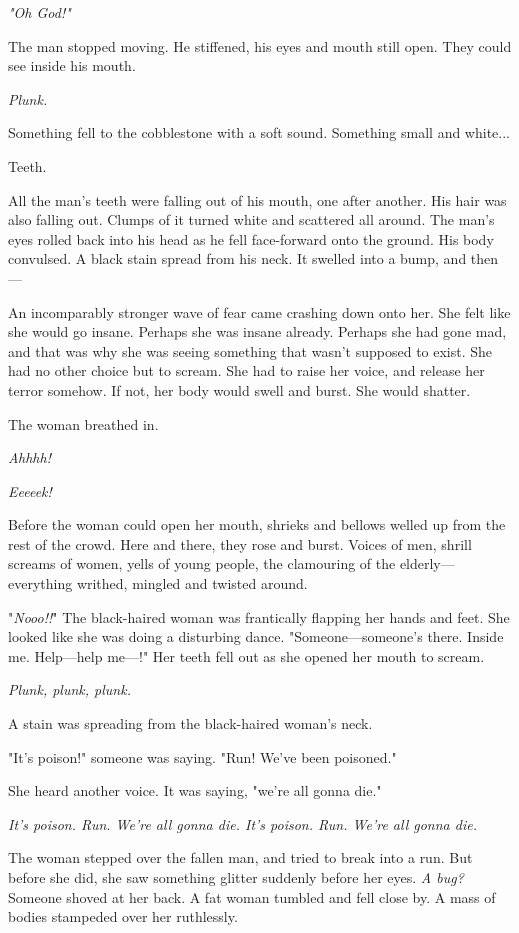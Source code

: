 \emph{"Oh God!"}

The man stopped moving. He stiffened, his eyes and mouth still open.
They could see inside his mouth.

\emph{Plunk.}

Something fell to the cobblestone with a soft sound. Something small and
white...

Teeth.

All the man's teeth were falling out of his mouth, one after another.
His hair was also falling out. Clumps of it turned white and scattered
all around. The man's eyes rolled back into his head as he fell
face-forward onto the ground. His body convulsed. A black stain spread
from his neck. It swelled into a bump, and then---

An incomparably stronger wave of fear came crashing down onto her. She
felt like she would go insane. Perhaps she was insane already. Perhaps
she had gone mad, and that was why she was seeing something that wasn't
supposed to exist. She had no other choice but to scream. She had to
raise her voice, and release her terror somehow. If not, her body would
swell and burst. She would shatter.

The woman breathed in.

\emph{Ahhhh!}

\emph{Eeeeek!}

Before the woman could open her mouth, shrieks and bellows welled up
from the rest of the crowd. Here and there, they rose and burst. Voices
of men, shrill screams of women, yells of young people, the clamouring
of the elderly---everything writhed, mingled and twisted around.

"\emph{Nooo!!}" The black-haired woman was frantically flapping her hands and
feet. She looked like she was doing a disturbing dance.
"Someone---someone's there. Inside me. Help---help me---!" Her teeth fell out
as she opened her mouth to scream.

\emph{Plunk, plunk, plunk.}

A stain was spreading from the black-haired woman's neck.

"It's poison!" someone was saying. "Run! We've been poisoned."

She heard another voice. It was saying, "we're all gonna die."

\emph{It's poison. Run. We're all gonna die. It's poison. Run. We're all gonna
die.}

The woman stepped over the fallen man, and tried to break into a run.
But before she did, she saw something glitter suddenly before her eyes.
\emph{A bug?} Someone shoved at her back. A fat woman tumbled and fell close
by. A mass of bodies stampeded over her ruthlessly.

